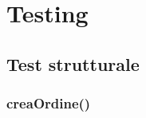 \chapter{Testing}

\section{Test strutturale}

\subsection{creaOrdine()}
\inputminted{java}{testing_white_box/creaOrdine.java}